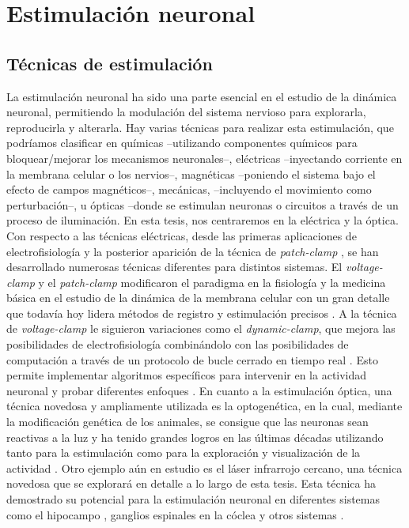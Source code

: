 \section{Estimulación neuronal}
\subsection{Técnicas de estimulación}

La estimulación neuronal ha sido una parte esencial en el estudio de la dinámica neuronal, permitiendo la modulación del sistema nervioso para explorarla, reproducirla y alterarla. Hay varias técnicas para realizar esta estimulación, que podríamos clasificar en químicas --utilizando componentes químicos para bloquear/mejorar los mecanismos neuronales--, eléctricas --inyectando corriente en la membrana celular o los nervios--, magnéticas --poniendo el sistema bajo el efecto de campos magnéticos--, mecánicas, --incluyendo el movimiento como perturbación--, u ópticas --donde se estimulan neuronas o circuitos a través de un proceso de iluminación. En esta tesis, nos centraremos en la eléctrica y la óptica. Con respecto a las técnicas eléctricas, desde las primeras aplicaciones de electrofisiología \parencite{marmont_studies_1949,cole_ions_1955,neher_singlechannel_1976} y la posterior aparición de la técnica de \textit{patch-clamp} \textcite{hamill_improved_1981}, se han desarrollado numerosas técnicas diferentes para distintos sistemas. El \textit{voltage-clamp} y el \textit{patch-clamp} modificaron el paradigma en la fisiología y la medicina básica en el estudio de la dinámica de la membrana celular con un gran detalle que todavía hoy lidera métodos de registro y estimulación precisos \parencite{hamill_improved_1981}. A la técnica de \textit{voltage-clamp} le siguieron variaciones como el \textit{dynamic-clamp}, que mejora las posibilidades de electrofisiología combinándolo con las posibilidades de computación a través de un protocolo de bucle cerrado en tiempo real \parencite{nowotny_dynamic_2022}. Esto permite implementar algoritmos específicos para intervenir en la actividad neuronal y probar diferentes enfoques \parencite{chamorro_generalization_2012}. En cuanto a la estimulación óptica, una técnica novedosa y ampliamente utilizada es la optogenética, en la cual, mediante la modificación genética de los animales, se consigue que las neuronas sean reactivas a la luz y ha tenido grandes logros en las últimas décadas utilizando tanto para la estimulación como para la exploración y visualización de la actividad \parencite{chen_roles_2022}. Otro ejemplo aún en estudio es el láser infrarrojo cercano, una técnica novedosa que se explorará en detalle a lo largo de esta tesis. Esta técnica ha demostrado su potencial para la estimulación neuronal en diferentes sistemas como el hipocampo \parencite{liang_temperaturedependent_2009}, ganglios espinales en la cóclea \parencite{goyal_acute_2012, barrett_pulsed_2018, brown_thermal_2020} y otros sistemas \parencite{shapiro_infrared_2012, cayce_infrared_2014, begeng_activity_2022}.

